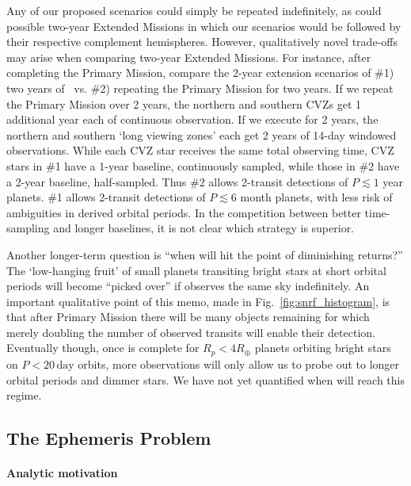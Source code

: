 

Any of our proposed scenarios could simply be repeated indefinitely,
as could possible two-year Extended Missions in which our scenarios 
would be followed by their respective complement hemispheres.
However, qualitatively novel trade-offs may arise when comparing two-year
Extended Missions.
For instance, after completing the Primary Mission, compare the 2-year
extension scenarios of \#1) two years of \hemis\ vs. \#2) repeating the 
Primary Mission for two years.
If we repeat the Primary Mission over 2 years, the northern
and southern CVZs get 1 additional year each of continuous observation.  
If we execute \hemis\:for 2 years, the northern and southern `long viewing
zones' each get 2 years of 14-day windowed observations. 
While each CVZ star receives the same total observing time, CVZ stars in \#1 
have a 1-year baseline, continuously sampled, while those in \#2 have a 2-year 
baseline, half-sampled.
Thus \#2 allows 2-transit detections of $P\lesssim1$ year planets.  \#1 allows 
2-transit detections of $P\lesssim6$ month planets, with less risk of 
ambiguities in derived orbital periods.  
In the competition between better time-sampling and longer baselines,
it is not clear which strategy is superior.

Another longer-term question is ``when will \tess hit the point of
diminishing returns?''  The `low-hanging fruit' of small planets
transiting bright stars at short orbital periods will become 
``picked over'' if \tess observes the same sky indefinitely.  
An important
qualitative point of this memo, made in Fig.~\ref{fig:snrf_histogram},
is that after \tesss Primary Mission there will be many objects
remaining for which merely doubling the number of observed transits
will enable their detection.  Eventually though, once \tess is complete
for $R_p<4R_\oplus$ planets orbiting bright stars on $P<20\,\mathrm{day}$ 
orbits, more observations will
only allow us to probe out to longer orbital periods and dimmer stars.
We have not yet quantified when \tess will reach this
regime.

\subsection{The Ephemeris Problem}
\label{sec:ephemeris_times}

\paragraph{Analytic motivation}

